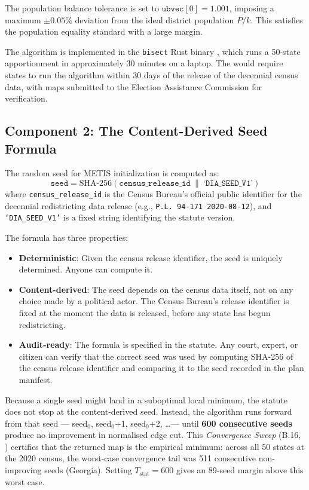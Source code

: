The population balance tolerance is set to $\texttt{ubvec}[0] = 1.001$,
imposing a maximum $\pm 0.05\%$ deviation from the ideal district population
$P/k$.
This satisfies the \karcher{} population equality standard with a large margin.

The algorithm is implemented in the \texttt{bisect} Rust binary
\citep{b0paper}, which runs a 50-state apportionment in approximately
30 minutes on a laptop.
The \dia{} would require states to run the algorithm within 30 days of
the release of the decennial census data, with maps submitted to the
Election Assistance Commission for verification.

\subsection{Component 2: The Content-Derived Seed Formula}

The random seed for METIS initialization is computed as:
\[
  \texttt{seed} = \text{SHA-256}(\texttt{census\_release\_id}\ \|\ \texttt{`DIA\_SEED\_V1'})
\]
where \texttt{census\_release\_id} is the Census Bureau's official public
identifier for the decennial redistricting data release (e.g.,
\texttt{P.L.\ 94-171\ 2020-08-12}), and \texttt{`DIA\_SEED\_V1'} is a
fixed string identifying the statute version.

The formula has three properties:
\begin{itemize}
  \item \textbf{Deterministic}: Given the census release identifier, the seed
    is uniquely determined.
    Anyone can compute it.
  \item \textbf{Content-derived}: The seed depends on the census data itself,
    not on any choice made by a political actor.
    The Census Bureau's release identifier is fixed at the moment the data
    is released, before any state has begun redistricting.
  \item \textbf{Audit-ready}: The formula is specified in the statute.
    Any court, expert, or citizen can verify that the correct seed was used
    by computing SHA-256 of the census release identifier and comparing it
    to the seed recorded in the plan manifest.
\end{itemize}

Because a single seed might land in a suboptimal local minimum, the statute
does not stop at the content-derived seed.
Instead, the algorithm runs forward from that seed — seed$_0$, seed$_0$+1,
seed$_0$+2, \ldots --- until \textbf{600 consecutive seeds} produce no
improvement in normalised edge cut.
This \emph{Convergence Sweep} (B.16, \citealt{b16paper}) certifies that the
returned map is the empirical minimum: across all 50 states at the 2020
census, the worst-case convergence tail was 511 consecutive non-improving seeds
(Georgia).
Setting $T_{\text{stat}} = 600$ gives an 89-seed margin above this worst case.

